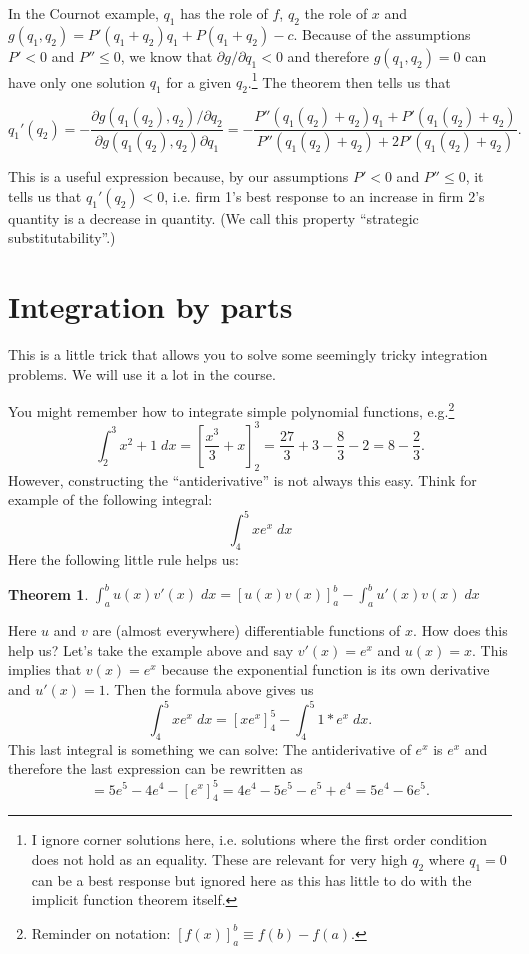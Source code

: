 \documentclass[a4paper,12pt]{article}
\newtheorem{theorem}{Theorem}
\theoremstyle{plain}
\begin{document}
In the Cournot example, $q_1$ has the role of $f$, $q_2$ the role of $x$ and $g(q_1,q_2)= P'(q_1+q_2)q_1+P(q_1+q_2)-c$. Because of the assumptions $P'<0$ and $P''\leq 0$, we know that $\partial g/\partial q_1<0$ and therefore $g(q_1,q_2)=0$ can have only one solution $q_1$ for a given $q_2$.\footnote{I ignore corner solutions here, i.e. solutions where the first order condition does not hold as an equality. These are relevant for very high $q_2$ where $q_1=0$ can be a best response but ignored here as this has little to do with the implicit function theorem itself.} The theorem then tells us that

\begin{equation*}
   q_1'(q_2)=-\frac{\partial g(q_1(q_2),q_2)/\partial q_2}{\partial g(q_1(q_2),q_2)\partial q_1}=-\frac{P''(q_1(q_2)+q_2)q_1+P'(q_1(q_2)+q_2)}{P''(q_1(q_2)+q_2)+2P'(q_1(q_2)+q_2)}.
\end{equation*}

This is a useful expression because, by our assumptions $P'<0$ and $P''\leq0$, it tells us that $q_1'(q_2)<0$, i.e. firm 1's best response to an increase in firm 2's quantity is a decrease in quantity. (We call this property ``strategic substitutability''.)

\section{Integration by parts}
\label{sec:integration-parts}

This is a little trick that allows you to solve some seemingly tricky integration problems. We will use it a lot in the course. 

You might remember how to integrate simple polynomial functions, e.g.\footnote{Reminder on notation: $[f(x)]_a^b\equiv f(b)-f(a)$.}
$$\int_{2}^{3}x^{2}+1\;dx=\left[ \frac{x^{3}}{3}+x\right]_{2}^{3}=\frac{27}{3}+3-\frac{8}{3}-2=8-\frac{2}{3}.$$
However, constructing the ``antiderivative'' is not always this easy. Think for example of the following integral:
$$\int_{4}^{5} x e^{x}\;dx$$
Here the following little rule helps us:
\begin{theorem}
$\int_{a}^{b}u(x)v'(x)\;dx=\left[u(x)v(x)\right]_{a}^{b}-\int_{a}^{b}u'(x)v(x)\;dx$
\end{theorem} 

Here $u$ and $v$ are (almost everywhere) differentiable functions of $x$. How does this help us? Let's take the example above and say $v'(x)=e^x$ and $u(x)=x$. This implies that $v(x)=e^x$ because the exponential function is its own derivative and $u'(x)=1$. Then the formula above gives us
\begin{equation*}
  \int_4^5 x e^x\;dx=\left[x e^x\right]_4^5-\int_4^5 1*e^x\;dx.
\end{equation*}
This last integral is something we can solve: The antiderivative of $e^x$ is $e^x$ and therefore the last expression can be rewritten as
\begin{equation*}
  = 5 e^5-4 e^4-\left[e^x\right]_4^5=4 e^4-5 e^5-e^5+e^4=5 e^4-6 e^5.
\end{equation*}
\end{document}
